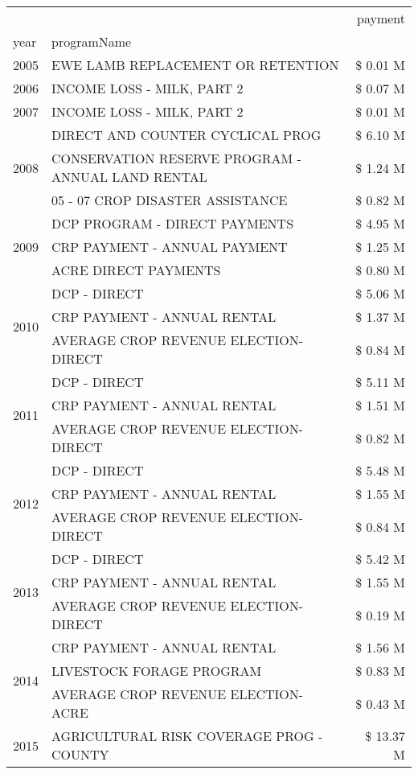 \begin{tabular}{llr}
\toprule
 &  & payment \\
year & programName &  \\
\midrule
2005 & EWE LAMB REPLACEMENT OR RETENTION & \$ 0.01 M \\
\cline{1-3}
2006 & INCOME LOSS - MILK, PART 2 & \$ 0.07 M \\
\cline{1-3}
2007 & INCOME LOSS - MILK, PART 2 & \$ 0.01 M \\
\cline{1-3}
\multirow[t]{3}{*}{2008} & DIRECT AND COUNTER CYCLICAL PROG & \$ 6.10 M \\
 & CONSERVATION RESERVE PROGRAM - ANNUAL LAND RENTAL & \$ 1.24 M \\
 & 05 - 07 CROP DISASTER ASSISTANCE & \$ 0.82 M \\
\cline{1-3}
\multirow[t]{3}{*}{2009} & DCP PROGRAM - DIRECT PAYMENTS & \$ 4.95 M \\
 & CRP PAYMENT - ANNUAL PAYMENT & \$ 1.25 M \\
 & ACRE DIRECT PAYMENTS & \$ 0.80 M \\
\cline{1-3}
\multirow[t]{3}{*}{2010} & DCP - DIRECT & \$ 5.06 M \\
 & CRP PAYMENT - ANNUAL RENTAL & \$ 1.37 M \\
 & AVERAGE CROP REVENUE ELECTION-DIRECT & \$ 0.84 M \\
\cline{1-3}
\multirow[t]{3}{*}{2011} & DCP - DIRECT & \$ 5.11 M \\
 & CRP PAYMENT - ANNUAL RENTAL & \$ 1.51 M \\
 & AVERAGE CROP REVENUE ELECTION-DIRECT & \$ 0.82 M \\
\cline{1-3}
\multirow[t]{3}{*}{2012} & DCP - DIRECT & \$ 5.48 M \\
 & CRP PAYMENT - ANNUAL RENTAL & \$ 1.55 M \\
 & AVERAGE CROP REVENUE ELECTION-DIRECT & \$ 0.84 M \\
\cline{1-3}
\multirow[t]{3}{*}{2013} & DCP - DIRECT & \$ 5.42 M \\
 & CRP PAYMENT - ANNUAL RENTAL & \$ 1.55 M \\
 & AVERAGE CROP REVENUE ELECTION-DIRECT & \$ 0.19 M \\
\cline{1-3}
\multirow[t]{3}{*}{2014} & CRP PAYMENT - ANNUAL RENTAL & \$ 1.56 M \\
 & LIVESTOCK FORAGE PROGRAM & \$ 0.83 M \\
 & AVERAGE CROP REVENUE ELECTION-ACRE & \$ 0.43 M \\
\cline{1-3}
\multirow[t]{3}{*}{2015} & AGRICULTURAL RISK COVERAGE PROG - COUNTY & \$ 13.37 M \\

\end{tabular}
